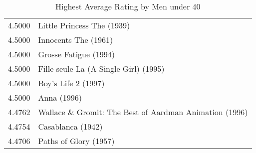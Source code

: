 \begin{flushleft}
\begin{table}[h]
\begin{tabular}{|ll|}
4.5000 & Little Princess The (1939)                              \\
4.5000 & Innocents The (1961)                                    \\
4.5000 & Grosse Fatigue (1994)                                   \\
4.5000 & Fille seule La (A Single Girl) (1995)                   \\
4.5000 & Boy's Life 2 (1997)                                     \\
4.5000 & Anna (1996)                                             \\  \hline
4.4762 & Wallace \& Gromit: The Best of Aardman Animation (1996) \\ \hline
4.4754 & Casablanca (1942)                                       \\ \hline
4.4706 & Paths of Glory (1957)                                   \\ \hline

\end{tabular}
\caption{Highest Average Rating by Men under 40}
\end{table}


\end{flushleft}




